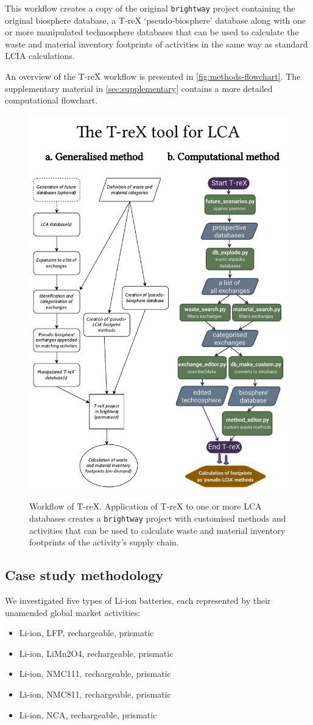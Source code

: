This workflow creates a copy of the original \texttt{brightway} project containing the original biosphere database, a T-reX `pseudo-biosphere' database along with one or more manipulated technosphere databases that can be used to calculate the waste and material inventory footprints of activities in the same way as standard LCIA calculations.

An overview of the T-reX workflow is presented in \autoref{fig:methods-flowchart}. The supplementary material in \autoref{sec:supplementary} contains a more detailed computational flowchart.

\begin{figure}[H]
    \centering
    \caption{Workflow of T-reX. Application of T-reX to one or more LCA databases creates a \texttt{brightway} project with customised methods and activities that can be used to calculate waste and material inventory footprints of the activity's supply chain.}
    \includegraphics[width=0.5\linewidth]{figures/T-reX_method.pdf}\label{fig:methods-flowchart}
\end{figure}


\subsection{Case study methodology}\label{sec:method-casestudy}

We investigated five types of Li-ion batteries, each represented by their unamended global market activities:
\begin{itemize}[itemsep=0pt]
    \item Li-ion, LFP, rechargeable, prismatic
    \item Li-ion, LiMn2O4, rechargeable, prismatic
    \item Li-ion, NMC111, rechargeable, prismatic
    \item Li-ion, NMC811, rechargeable, prismatic
    \item Li-ion, NCA, rechargeable, prismatic
\end{itemize}

